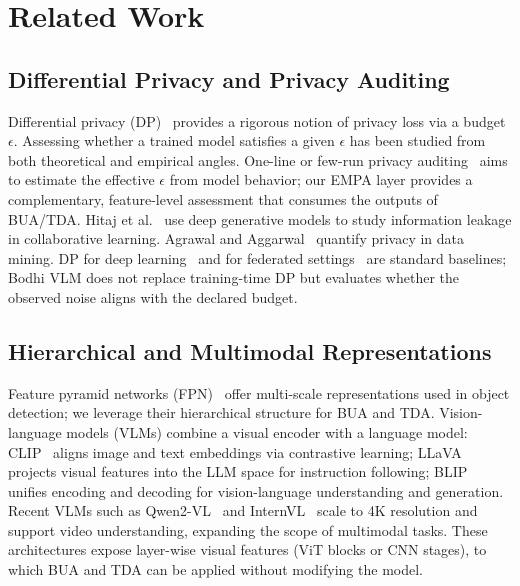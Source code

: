 \documentclass[journal,transmag]{IEEEtran}
\begin{document}
\section{Related Work}
\label{sec:related}

\subsection{Differential Privacy and Privacy Auditing}
\label{subsec:related-dp}
Differential privacy (DP)~\cite{dwork2008differential} provides a rigorous notion of privacy loss via a budget $\epsilon$. Assessing whether a trained model satisfies a given $\epsilon$ has been studied from both theoretical and empirical angles. One-line or few-run privacy auditing~\cite{narayanan2021rethinking,jagielski2022differentially} aims to estimate the effective $\epsilon$ from model behavior; our EMPA layer provides a complementary, feature-level assessment that consumes the outputs of BUA/TDA. Hitaj et al.~\cite{hitaj2017deep} use deep generative models to study information leakage in collaborative learning. Agrawal and Aggarwal~\cite{agrawal2001design} quantify privacy in data mining. DP for deep learning~\cite{abadi2016deep} and for federated settings~\cite{mcmahan2017communication} are standard baselines; Bodhi VLM does not replace training-time DP but evaluates whether the observed noise aligns with the declared budget.

\subsection{Hierarchical and Multimodal Representations}
\label{subsec:related-repr}
Feature pyramid networks (FPN)~\cite{lin2017feature} offer multi-scale representations used in object detection; we leverage their hierarchical structure for BUA and TDA. Vision-language models (VLMs) combine a visual encoder with a language model: CLIP~\cite{radford2021learning} aligns image and text embeddings via contrastive learning; LLaVA~\cite{liu2023llava} projects visual features into the LLM space for instruction following; BLIP~\cite{li2022blip} unifies encoding and decoding for vision-language understanding and generation. Recent VLMs such as Qwen2-VL~\cite{wang2024qwen2vl} and InternVL~\cite{chen2024internvl} scale to 4K resolution and support video understanding, expanding the scope of multimodal tasks. These architectures expose layer-wise visual features (ViT blocks or CNN stages), to which BUA and TDA can be applied without modifying the model.
\end{document}
